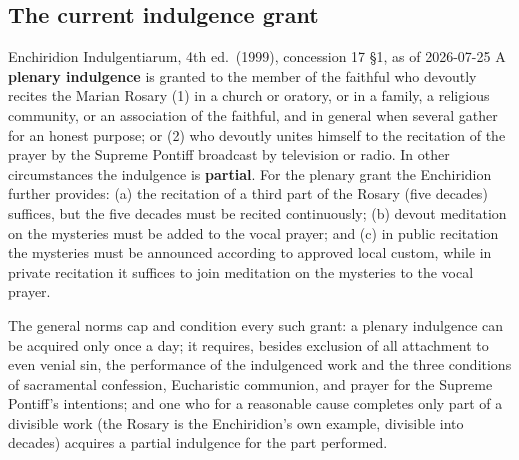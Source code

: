 \subsection{The current indulgence grant}

\begin{disciplinebox}{Enchiridion Indulgentiarum, 4th ed.\ (1999),
concession 17 \S 1, as of 2026-07-25}
A \textbf{plenary indulgence} is granted to the member of the faithful
who devoutly recites the Marian Rosary (1) in a church or oratory, or
in a family, a religious community, or an association of the faithful,
and in general when several gather for an honest purpose; or (2) who
devoutly unites himself to the recitation of the prayer by the Supreme
Pontiff broadcast by television or radio. In other circumstances the
indulgence is \textbf{partial}. For the plenary grant the Enchiridion
further provides: (a) the recitation of a third part of the Rosary
(five decades) suffices, but the five decades must be recited
continuously; (b) devout meditation on the mysteries must be added to
the vocal prayer; and (c) in public recitation the mysteries must be
announced according to approved local custom, while in private
recitation it suffices to join meditation on the mysteries to the
vocal prayer.
\end{disciplinebox}

The general norms cap and condition every such grant: a plenary
indulgence can be acquired only once a day; it requires, besides
exclusion of all attachment to even venial sin, the performance of the
indulgenced work and the three conditions of sacramental confession,
Eucharistic communion, and prayer for the Supreme Pontiff's
intentions; and one who for a reasonable cause completes only part of a
divisible work (the Rosary is the Enchiridion's own example, divisible
into decades) acquires a partial indulgence for the part
performed.

